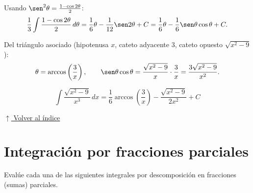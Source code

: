 \documentclass[12pt]{article}
\newcommand{\volverindice}{%
    \vspace{1em}%
    \begin{flushright}%
        \hyperlink{indice}{\small $\uparrow$ Volver al índice}%
    \end{flushright}%
}
\begin{document}
\begin{enumerate}[label=\alph*.-]
    Usando $\sen^2\theta=\frac{1-\cos2\theta}{2}$:
    \[
    \frac13\int\frac{1-\cos2\theta}{2}\,d\theta
    =\frac16\theta-\frac{1}{12}\sen2\theta+C
    =\frac16\theta-\frac16\sen\theta\cos\theta+C.
    \]

    Del triángulo asociado (hipotenusa $x$, cateto adyacente $3$,
    cateto opuesto $\sqrt{x^2-9}$):
    \[
    \theta=\arccos\left(\frac3x\right),\qquad
    \sen\theta\cos\theta=\frac{\sqrt{x^2-9}}{x}\cdot\frac3x
    =\frac{3\sqrt{x^2-9}}{x^2}.
    \]

    \[
    \boxed{
    \int\frac{\sqrt{x^2-9}}{x^3}\,dx
    =\frac16\arccos\left(\frac3x\right)-\frac{\sqrt{x^2-9}}{2x^2}+C
    }
    \]

\end{enumerate}

\volverindice
\newpage


\section{Integración por fracciones parciales}

Evalúe cada una de las siguientes integrales por descomposición en
fracciones (sumas) parciales.
\end{document}
